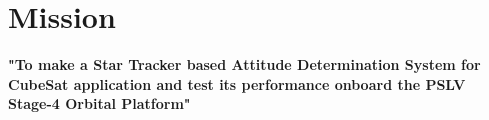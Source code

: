 \documentclass[../../main.tex]{subfiles}
\begin{document}
\chapter{Mission}
\thispagestyle{fancy}


\textbf{"To make a Star Tracker based Attitude Determination System for CubeSat application and test its performance onboard the PSLV Stage-4 Orbital Platform"}
\end{document}

